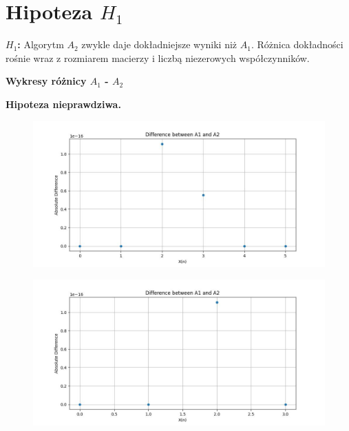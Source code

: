 \documentclass{article}
\begin{document}
\clearpage

\section{Hipoteza  $H_1$}
\textbf{$H_1$:} Algorytm  $A_2$ zwykle daje dokładniejsze wyniki niż $A_1$. Różnica dokładności rośnie wraz z rozmiarem macierzy i liczbą niezerowych współczynników.

\hspace{}

\textbf{Wykresy różnicy $A_1$ - $A_2$}

\textbf{Hipoteza nieprawdziwa.} 
\clearpage

\begin{figure}[ht!]
    \centering
    \includegraphics[width=1\linewidth]{h1_plot_7.jpg}
    \label{fig:my_label}
\end{figure}

\begin{figure}[ht!]
    \centering
    \includegraphics[width=1\linewidth]{h1_plot_8.jpg}
    \label{fig:my_label}
\end{figure}
\end{document}
